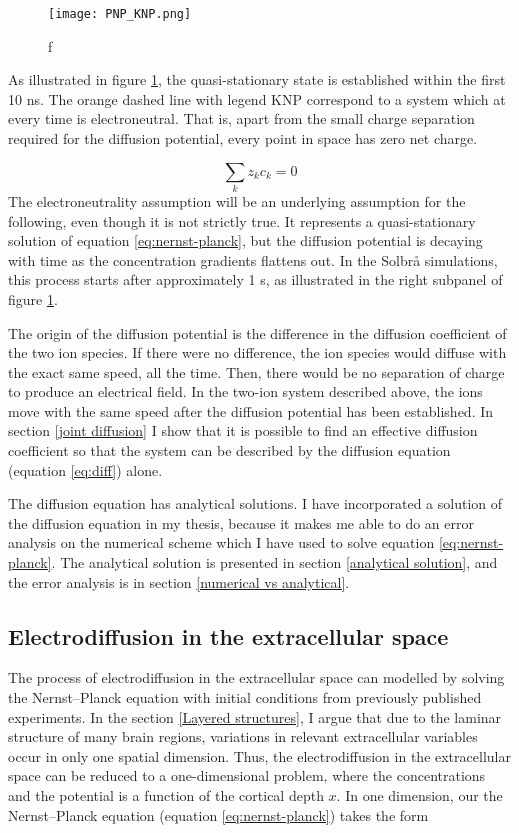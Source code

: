 \documentclass{article}
\begin{document}
\begin{figure}
  \texttt{[image: PNP\_KNP.png]}
  \caption{f}
  \label{fig:PNP_KNP}
\end{figure}
As illustrated in figure \ref{fig:PNP_KNP}, the quasi-stationary state is established within the first 10 ns. The orange dashed line with legend KNP correspond to a system which at every time is electroneutral. That is, apart from the small charge separation required for the diffusion potential, every point in space has zero net charge. 

$$\sum _k z_k c_k =0$$
The electroneutrality assumption will be an underlying assumption for the following, even though it is not strictly true. It represents a quasi-stationary solution of equation \ref{eq:nernst-planck}, but the diffusion potential is decaying with time as the concentration gradients flattens out. In the Solbr{\aa} simulations, this process starts after approximately 1 s, as illustrated in the right subpanel of figure \ref{fig:PNP_KNP}. 



The origin of the diffusion potential is the difference in the diffusion coefficient of the two ion species. If there were no difference, the ion species would diffuse with the exact same speed, all the time. Then, there would be no separation of charge to produce an electrical field. In the two-ion system described above, the ions move with the same speed after the diffusion potential has been established. In section \ref{joint diffusion} I show that  it is possible to find an effective diffusion coefficient so that the system can be described by the diffusion equation (equation  \ref{eq:diff}) alone. 

The diffusion equation has analytical solutions. I have incorporated a solution of the diffusion equation in my thesis, because it makes me able to do an error analysis on the numerical scheme which I have used to solve equation \ref{eq:nernst-planck}. The analytical solution is presented in section \ref{analytical solution}, and the error analysis is in section \ref{numerical vs analytical}.

\subsection{Electrodiffusion in the extracellular space}\label{el.diff in ES}


The process of electrodiffusion in the extracellular space can modelled by solving the Nernst--Planck equation with initial conditions from previously published experiments. In the section \ref{Layered structures}, I argue that due to the laminar structure of many brain regions, variations in relevant extracellular variables occur in only one spatial dimension. Thus, the electrodiffusion in the extracellular space can be reduced to a one-dimensional problem, where the concentrations and the potential is a function of the cortical depth $x$. In one dimension, our the Nernst--Planck equation (equation \ref{eq:nernst-planck}) takes the form 
\end{document}
